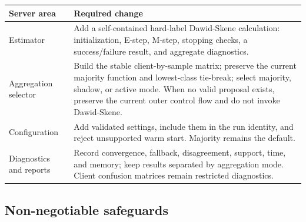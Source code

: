 \documentclass[10pt,a4paper]{article}
\begin{document}
\begin{table}[H]
\centering
\begin{tabularx}{\textwidth}{L{0.25\textwidth}Y}
\toprule
\textbf{Server area} & \textbf{Required change} \\
\midrule
Estimator & Add a self-contained hard-label Dawid-Skene calculation: initialization, E-step,
M-step, stopping checks, a success/failure result, and aggregate diagnostics. \\
Aggregation selector & Build the stable client-by-sample matrix; preserve the current majority
function and lowest-class tie-break; select majority, shadow, or active mode. When no valid proposal
exists, preserve the current outer control flow and do not invoke Dawid-Skene. \\
Configuration & Add validated settings, include them in the run identity, and reject unsupported
warm start. Majority remains the default. \\
Diagnostics and reports & Record convergence, fallback, disagreement, support, time, and memory;
keep results separated by aggregation mode. Client confusion matrices remain restricted diagnostics. \\
\bottomrule
\end{tabularx}
\end{table}

\subsection{Non-negotiable safeguards}
\end{document}
